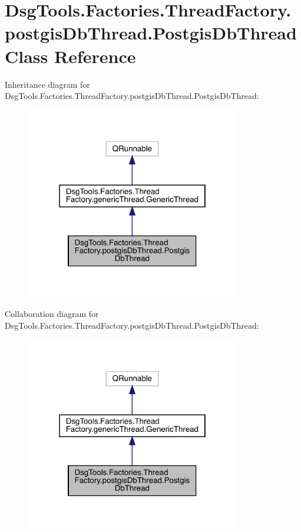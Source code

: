\hypertarget{class_dsg_tools_1_1_factories_1_1_thread_factory_1_1postgis_db_thread_1_1_postgis_db_thread}{}\section{Dsg\+Tools.\+Factories.\+Thread\+Factory.\+postgis\+Db\+Thread.\+Postgis\+Db\+Thread Class Reference}
\label{class_dsg_tools_1_1_factories_1_1_thread_factory_1_1postgis_db_thread_1_1_postgis_db_thread}


Inheritance diagram for Dsg\+Tools.\+Factories.\+Thread\+Factory.\+postgis\+Db\+Thread.\+Postgis\+Db\+Thread\+:
\nopagebreak
\begin{figure}[H]
\begin{center}
\leavevmode
\includegraphics[width=265pt]{class_dsg_tools_1_1_factories_1_1_thread_factory_1_1postgis_db_thread_1_1_postgis_db_thread__inherit__graph}
\end{center}
\end{figure}


Collaboration diagram for Dsg\+Tools.\+Factories.\+Thread\+Factory.\+postgis\+Db\+Thread.\+Postgis\+Db\+Thread\+:
\nopagebreak
\begin{figure}[H]
\begin{center}
\leavevmode
\includegraphics[width=265pt]{class_dsg_tools_1_1_factories_1_1_thread_factory_1_1postgis_db_thread_1_1_postgis_db_thread__coll__graph}
\end{center}
\end{figure}
